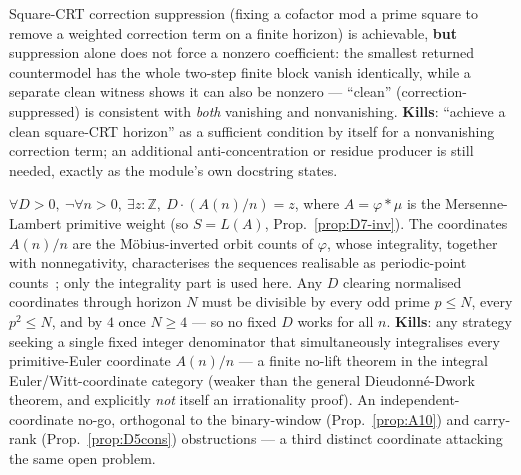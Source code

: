 \begin{obs}\label{prop:B8-kill}
Square-CRT correction suppression (fixing a cofactor mod a prime square to remove a weighted
correction term on a finite horizon) is achievable, \textbf{but} suppression alone does not force
a nonzero coefficient: the smallest returned countermodel has the whole two-step finite block
vanish identically, while a separate clean witness shows it can also be nonzero — ``clean''
(correction-suppressed) is consistent with \emph{both} vanishing and nonvanishing. \textbf{Kills}:
``achieve a clean square-CRT horizon'' as a sufficient condition by itself for a nonvanishing
correction term; an additional anti-concentration or residue producer is still needed, exactly as
the module's own docstring states.
\ \ \\
\end{obs}

\begin{obs}\label{prop:D6-kill}
$\forall D>0,\ \neg\forall n>0,\ \exists z{:}\mathbb Z,\ D\cdot(A(n)/n)=z$, where $A=\varphi*\mu$ is
the Mersenne-Lambert primitive weight (so $S=L(A)$, Prop.~\ref{prop:D7-inv}).
The coordinates $A(n)/n$ are the M\"obius-inverted orbit counts of $\varphi$,
whose integrality, together with nonnegativity, characterises the sequences
realisable as periodic-point counts~\cite[Lemma~3.1, p.~5]{everest-periodic};
only the integrality part is used here. Any $D$ clearing
normalised coordinates through horizon $N$ must be divisible by every odd prime $p\le N$, every
$p^2\le N$, and by $4$ once $N\ge4$ — so no fixed $D$ works for all $n$. \textbf{Kills}: any
strategy seeking a single fixed integer denominator that simultaneously integralises every
primitive-Euler coordinate $A(n)/n$ — a finite no-lift theorem in the integral
Euler/Witt-coordinate category (weaker than the general Dieudonn\'e-Dwork theorem, and explicitly
\emph{not} itself an irrationality proof). An independent-coordinate no-go, orthogonal to the
binary-window (Prop.~\ref{prop:A10}) and carry-rank (Prop.~\ref{prop:D5cons}) obstructions — a
third distinct coordinate attacking the same open problem.
\ \ \\
\end{obs}

